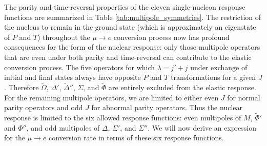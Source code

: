 \documentclass{book}[letterpaper,12pt]
\begin{document}
The parity and time-reversal properties of the eleven single-nucleon response functions are summarized in Table \ref{tab:multipole_symmetries}. The restriction of the nucleus to remain in the ground state (which is approximately an eigenstate of $P$ and $T$) throughout the $\mu\rightarrow e$ conversion process now has profound consequences for the form of the nuclear response: only those multipole operators that are even under both parity and time-reversal can contribute to the elastic conversion process. The five operators for which $\lambda=j'+j$ under exchange of initial and final states always have opposite $P$ and $T$ transformations for a given $J$. Therefore $\tilde{\Omega}$, $\Delta'$, $\tilde{\Delta}''$, $\Sigma$, and $\tilde{\Phi}$ are entirely excluded from the elastic response. For the remaining multipole operators, we are limited to either even $J$ for normal parity operators and odd $J$ for abnormal parity operators.  Thus the nuclear response is limited to the six allowed response functions: even multipoles of $M$, $\tilde{\Phi}'$ and $\Phi''$, and odd multipoles of $\Delta$, $\Sigma'$, and $\Sigma''$. We will now derive an expression for the $\mu\rightarrow e$ conversion rate in terms of these six response functions.
\end{document}
